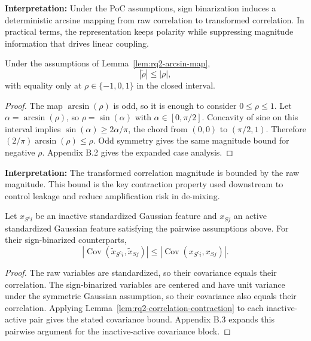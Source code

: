 \textbf{Interpretation:} Under the PoC assumptions, sign binarization induces a deterministic arcsine mapping from raw correlation to transformed correlation. In practical terms, the representation keeps polarity while suppressing magnitude information that drives linear coupling.

\begin{lemma}\label{lem:rq2-correlation-contraction}
Under the assumptions of Lemma~\ref{lem:rq2-arcsin-map},
\begin{equation}\label{eq:rq2-lemma2-correlation-contraction}
|\tilde{\rho}| \leq |\rho|,
\end{equation}
with equality only at $\rho\in\{-1,0,1\}$ in the closed interval.
\end{lemma}

\begin{proof}
The map $\arcsin(\rho)$ is odd, so it is enough to consider $0\leq\rho\leq1$. Let $\alpha=\arcsin(\rho)$, so $\rho=\sin(\alpha)$ with $\alpha\in[0,\pi/2]$. Concavity of sine on this interval implies $\sin(\alpha)\geq 2\alpha/\pi$, the chord from $(0,0)$ to $(\pi/2,1)$. Therefore $(2/\pi)\arcsin(\rho)\leq\rho$. Odd symmetry gives the same magnitude bound for negative $\rho$. Appendix B.2 gives the expanded case analysis.
\end{proof}

\textbf{Interpretation:} The transformed correlation magnitude is bounded by the raw magnitude. This bound is the key contraction property used downstream to control leakage and reduce amplification risk in de-mixing.

\begin{lemma}\label{lem:rq2-leakage-contraction}
Let $x_{{S^c}i}$ be an inactive standardized Gaussian feature and $x_{Sj}$ an active standardized Gaussian feature satisfying the pairwise assumptions above. For their sign-binarized counterparts,
\begin{equation}\label{eq:rq2-lemma3-leakage-contraction}
\left| \operatorname{Cov}(\tilde{x}_{{S^c}i}, \tilde{x}_{Sj}) \right|
\leq
\left| \operatorname{Cov}(x_{{S^c}i}, x_{Sj}) \right|.
\end{equation}
\end{lemma}

\begin{proof}
The raw variables are standardized, so their covariance equals their correlation. The sign-binarized variables are centered and have unit variance under the symmetric Gaussian assumption, so their covariance also equals their correlation. Applying Lemma~\ref{lem:rq2-correlation-contraction} to each inactive-active pair gives the stated covariance bound. Appendix B.3 expands this pairwise argument for the inactive-active covariance block.
\end{proof}

